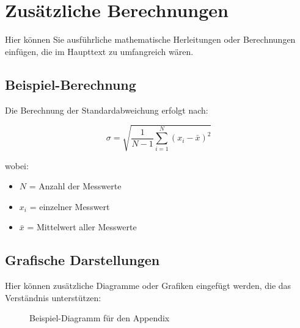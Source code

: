 
\section{Zusätzliche Berechnungen} \label{app:calculations}

Hier können Sie ausführliche mathematische Herleitungen oder Berechnungen einfügen, die im Haupttext zu umfangreich wären.

\subsection{Beispiel-Berechnung}
Die Berechnung der Standardabweichung erfolgt nach:

$$\sigma = \sqrt{\frac{1}{N-1} \sum_{i=1}^{N} (x_i - \bar{x})^2}$$

wobei:
\begin{itemize}
    \item $N$ = Anzahl der Messwerte
    \item $x_i$ = einzelner Messwert
    \item $\bar{x}$ = Mittelwert aller Messwerte
\end{itemize}

\subsection{Grafische Darstellungen}
Hier können zusätzliche Diagramme oder Grafiken eingefügt werden, die das Verständnis unterstützen:

\begin{figure}[h!]
\centering
\caption{Beispiel-Diagramm für den Appendix}
\label{fig:appendix_diagram}
\end{figure}